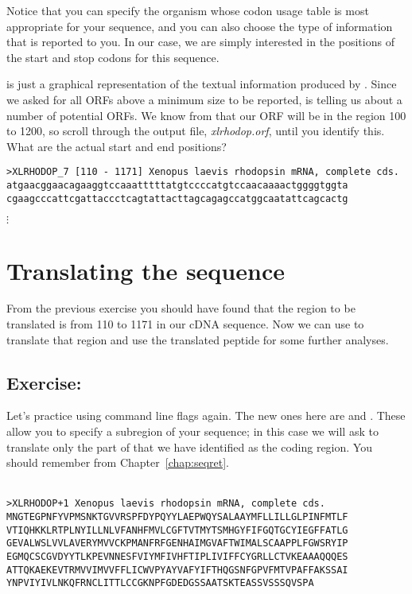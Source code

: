 \documentclass[12pt]{report}
\begin{document}
Notice that you	can specify the	organism whose codon usage table is
most appropriate for your sequence, and	you can	also choose the	type
of information that is reported	to you.	In our case, we	are simply
interested in the positions of the start and stop codons for this
sequence.

 is just a graphical representation of the textual
information produced by	. Since we	asked for all ORFs
above a	minimum	size to	be reported,  is telling us about
a number of potential ORFs. We know from 	that our ORF
will be	in the region 100 to 1200, so scroll through the output	file,
{\em xlrhodop.orf}, until you identify this. What are the actual start
and end	positions?

\unix{}
\begin{verbatim}
>XLRHODOP_7 [110 - 1171] Xenopus laevis	rhodopsin mRNA,	complete cds.
atgaacggaacagaaggtccaaatttttatgtccccatgtccaacaaaactggggtggta
cgaagcccattcgattaccctcagtattacttagcagagccatggcaatattcagcactg
\end{verbatim}
$\vdots$

\section{Translating the sequence}

From the previous exercise you should have found that the region to be
translated is from 110 to 1171 in our cDNA sequence. Now we can	use
	to translate that region and use the translated
peptide	for some further analyses.

\subsection*{Exercise: }

Let's practice using command line flags	again. The new ones here are
 and . These allow you to specify a
subregion of your sequence; in this case we will ask
 to translate only the part of
 that we have identified as	the coding
region.	You should remember  from
Chapter~\ref{chap:seqret}.\\

\unix{}\\

\unix{}
\begin{verbatim}
>XLRHODOP+1 Xenopus laevis rhodopsin mRNA, complete cds.
MNGTEGPNFYVPMSNKTGVVRSPFDYPQYYLAEPWQYSALAAYMFLLILLGLPINFMTLF
VTIQHKKLRTPLNYILLNLVFANHFMVLCGFTVTMYTSMHGYFIFGQTGCYIEGFFATLG
GEVALWSLVVLAVERYMVVCKPMANFRFGENHAIMGVAFTWIMALSCAAPPLFGWSRYIP
EGMQCSCGVDYYTLKPEVNNESFVIYMFIVHFTIPLIVIFFCYGRLLCTVKEAAAQQQES
ATTQKAEKEVTRMVVIMVVFFLICWVPYAYVAFYIFTHQGSNFGPVFMTVPAFFAKSSAI
YNPVIYIVLNKQFRNCLITTLCCGKNPFGDEDGSSAATSKTEASSVSSSQVSPA
\end{verbatim}
\end{document}
